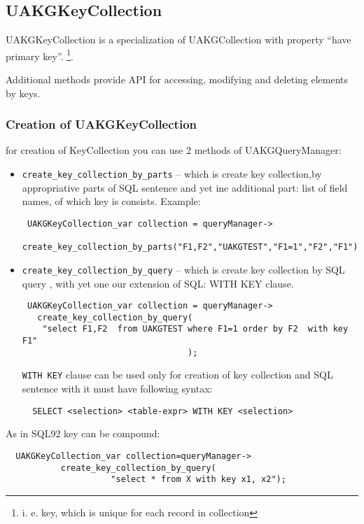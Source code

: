 \subsection{ UAKGKeyCollection}

 UAKGKeyCollection is a specialization of UAKGCollection with property
``have primary key''. \footnote{i. e. key, which is unique for each record in collection }.

 Additional methods provide API for accessing, modifying and deleting elements
by keys.

\subsubsection{ Creation of UAKGKeyCollection }

 for creation of KeyCollection you can use 2 methods of UAKGQueryManager:
\begin{itemize}
  \item \verb|create_key_collection_by_parts| -- which is create key collection,by appropriative parts of SQL sentence and yet ine additional part: list of field names, of which key is consists.
Example:
\begin{verbatim}
 UAKGKeyCollection_var collection = queryManager->
   create_key_collection_by_parts("F1,F2","UAKGTEST","F1=1","F2","F1");
\end{verbatim}
 \item \verb|create_key_collection_by_query| -- which is create key collection by SQL query , with yet one our extension of SQL: WITH KEY clause.
\begin{verbatim}
 UAKGKeyCollection_var collection = queryManager->
   create_key_collection_by_query(
    "select F1,F2  from UAKGTEST where F1=1 order by F2  with key F1"
                                 );
\end{verbatim}
  \verb|WITH KEY| clause can be used only for creation of key collection and
SQL sentence with it must have following syntax:
\begin{verbatim}
  SELECT <selection> <table-expr> WITH KEY <selection>
\end{verbatim} 
\end{itemize}

 As in SQL92 key can be compound:
\begin{verbatim}
  UAKGKeyCollection_var collection=queryManager->
           create_key_collection_by_query(
                     "select * from X with key x1, x2");
\end{verbatim}

